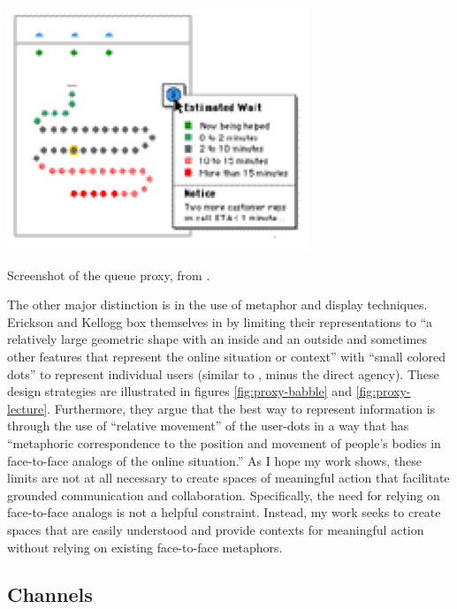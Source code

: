 


\begin{marginfigure}
	\includegraphics{figures/queue.png}
	\caption{Screenshot of the queue proxy, from \citep{Erickson:2003td}.}
	\label{fig:proxy-queue}
\end{marginfigure}

The other major distinction is in the use of metaphor and display techniques. Erickson and Kellogg box themselves in by limiting their representations to ``a relatively large geometric shape with an inside and an outside and sometimes other features that represent the online situation or context'' \citep{Erickson:2003td} with ``small colored dots'' to represent individual users (similar to \citep{Viegas:1999kv}, minus the direct agency). These design strategies are illustrated in figures \ref{fig:proxy-babble} and \ref{fig:proxy-lecture}. Furthermore, they argue that the best way to represent information is through the use of ``relative movement'' of the user-dots in a way that has ``metaphoric correspondence to the position and movement of people's bodies in face-to-face analogs of the online situation.'' \citep{Erickson:2003td} As I hope my work shows, these limits are not at all necessary to create spaces of meaningful action that facilitate grounded communication and collaboration. Specifically, the need for relying on face-to-face analogs is not a helpful constraint. Instead, my work seeks to create spaces that are easily understood and provide contexts for meaningful action without relying on existing face-to-face metaphors.



\subsection{Channels}

